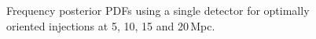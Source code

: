 \documentclass[showpacs, superscriptaddress, showpacs, letterpaper, showkeys,
preprintnumbers, altaffilletter, amssymb, amsmath, amsfonts, prd,
onecolumn, floatfix, nofootinbib]{revtex4-1}
\begin{document}
\begin{figure}
\begin{subfigure}{.4\textwidth}
{\label{fig:freqpdflines15Mpc}}
\end{subfigure}
\begin{subfigure}{.4\textwidth}
{\label{fig:freqpdflines20Mpc}}
\end{subfigure}
\caption{Frequency posterior PDFs using a single detector for optimally oriented
injections at 5, 10, 15 and 20\,Mpc.  \label{fig:freq_pdf_lines}}
\end{figure}
\end{document}

